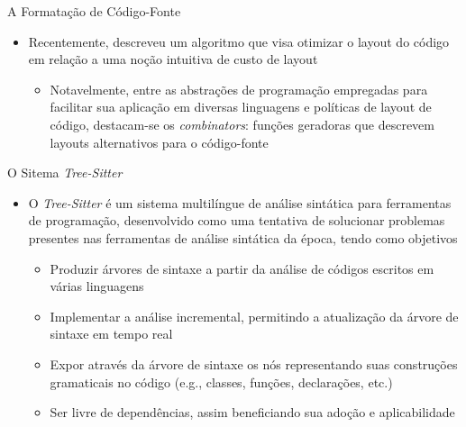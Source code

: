 \documentclass
  [ aspectratio=169,
    english,
    hyperref={citecolor=blue,colorlinks=true,linkcolor=blue,urlcolor=blue},
    brazil]
  {beamer}
\newcommand{\treesitter}{\textit{Tree-Sitter}\xspace}
\begin{document}
  \begin{frame}{A Formatação de Código-Fonte}
    \begin{itemize}
      \item Recentemente, \textcite{yelland-2015-new} descreveu um algoritmo
            que visa otimizar o layout do código em relação a uma noção
            intuitiva de custo de layout
            \begin{itemize}
              \item Notavelmente, entre as abstrações de programação
                    empregadas para facilitar sua aplicação em diversas
                    linguagens e políticas de layout de código,
                    destacam-se os \textit{combinators}: funções geradoras que
                    descrevem layouts alternativos para o código-fonte
            \end{itemize}
    \end{itemize}
  \end{frame}


  \begin{frame}{O Sitema \treesitter}
    \begin{itemize}
      \item O \treesitter \cite{tree-sitter-2023-tree} é um sistema multilíngue
            de análise sintática para ferramentas de programação, desenvolvido
            como uma tentativa de solucionar problemas presentes nas
            ferramentas de análise sintática da época, tendo como objetivos
            \begin{itemize}
              \item Produzir árvores de sintaxe a partir da análise de códigos
                    escritos em várias linguagens
              \item Implementar a análise incremental, permitindo a atualização
                    da árvore de sintaxe em tempo real
              \item Expor através da árvore de sintaxe os nós representando
                    suas construções gramaticais no código (e.g., classes,
                    funções, declarações, etc.)
              \item Ser livre de dependências, assim beneficiando sua adoção e
                    aplicabilidade
            \end{itemize}
    \end{itemize}
  \end{frame}
\end{document}
